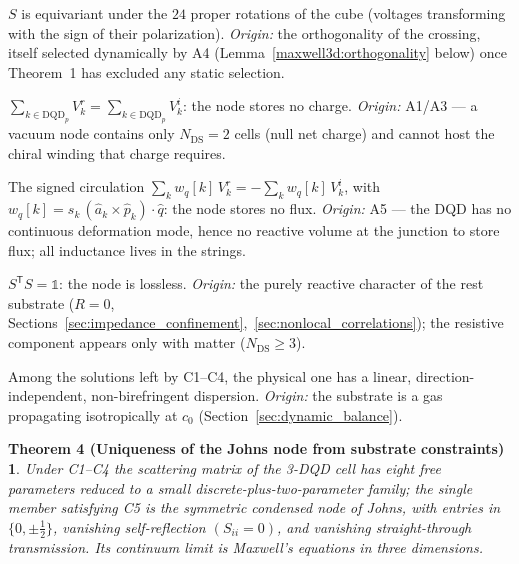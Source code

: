\documentclass[11pt,a4paper]{article}
\theoremstyle{plain}
\newtheorem*{thmD}{Theorem 4 (Uniqueness of the Johns node from substrate constraints)}
\theoremstyle{remark}
\newcommand{\Ncd}{\ensuremath{N_{\mathrm{DS}}}}
\begin{document}
\begin{description}[leftmargin=0pt,itemsep=2pt]
\item[C1 --- Cubic symmetry.] $S$ is equivariant under the $24$ proper rotations of the cube (voltages transforming with the sign of their polarization). \emph{Origin:} the orthogonality of the crossing, itself selected dynamically by A4 (Lemma~\ref{maxwell3d:orthogonality} below) once Theorem~1 has excluded any static selection.
\item[C2 --- Charge conservation per DQD.] $\sum_{k\in\text{DQD}_p} V^r_k = \sum_{k\in\text{DQD}_p} V^i_k$: the node stores no charge. \emph{Origin:} A1/A3 --- a vacuum node contains only $\Ncd=2$ cells (null net charge) and cannot host the chiral winding that charge requires.
\item[C3 --- Magnetic-flux conservation per axis.] The signed circulation $\sum_k w_q[k]\,V^r_k = -\sum_k w_q[k]\,V^i_k$, with $w_q[k]=s_k\,(\hat a_k\times\hat p_k)\cdot\hat q$: the node stores no flux. \emph{Origin:} A5 --- the DQD has no continuous deformation mode, hence no reactive volume at the junction to store flux; all inductance lives in the strings.
\item[C4 --- Energy conservation.] $S^{\mathsf T}S = \mathbb{1}$: the node is lossless. \emph{Origin:} the purely reactive character of the rest substrate ($R=0$, Sections~\ref{sec:impedance_confinement},~\ref{sec:nonlocal_correlations}); the resistive component appears only with matter ($\Ncd\geq3$).
\item[C5 --- Isotropy of the light cone.] Among the solutions left by C1--C4, the physical one has a linear, direction-independent, non-birefringent dispersion. \emph{Origin:} the substrate is a gas propagating isotropically at $c_0$ (Section~\ref{sec:dynamic_balance}).
\end{description}

\begin{thmD}
Under C1--C4 the scattering matrix of the 3-DQD cell has eight free parameters reduced to a small discrete-plus-two-parameter family; the single member satisfying C5 is the symmetric condensed node of Johns, with entries in $\{0,\pm\tfrac12\}$, vanishing self-reflection $(S_{ii}=0)$, and vanishing straight-through transmission. Its continuum limit is Maxwell's equations in three dimensions.
\end{thmD}
\end{document}
